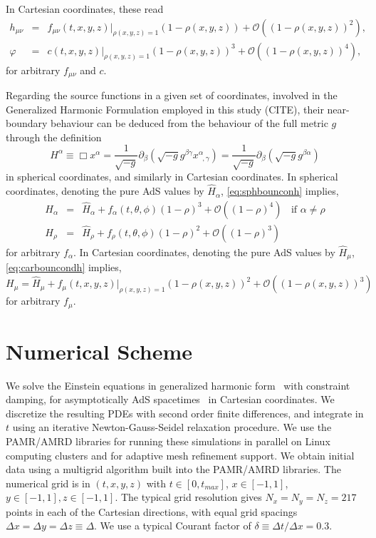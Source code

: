 \documentclass[a4paper,11pt]{article}
\begin{document}
In Cartesian coordinates, these read
\begin{eqnarray}
\label{eq:carbouncondh}
h_{\mu\nu}&=&f_{\mu\nu}(t,x,y,z)|_{\rho(x,y,z)=1}(1-\rho(x,y,z))+\mathcal{O}((1-\rho(x,y,z))^{2}), \\
\label{eq:carbouncondphi}
\varphi&=&c(t,x,y,z)|_{\rho(x,y,z)=1}(1-\rho(x,y,z))^3+\mathcal{O}((1-\rho(x,y,z))^{4}), 
\end{eqnarray}
for arbitrary $f_{\mu\nu}$ and $c$.

Regarding the source functions in a given set of coordinates, involved in the Generalized Harmonic Formulation employed in this study (CITE), their near-boundary behaviour can be deduced from the behaviour of the full metric $g$ through the definition 
\begin{equation}\label{eq:defsoufunsph}
H^\alpha \equiv \Box x^\alpha = \frac{1}{\sqrt{-g}}\partial_\beta (\sqrt{-g}g^{\beta\gamma}x^\alpha_{\;\;,\gamma})=\frac{1}{\sqrt{-g}}\partial_\beta (\sqrt{-g}g^{\beta\alpha})
\end{equation}
in spherical coordinates, and similarly in Cartesian coordinates. 
In spherical coordinates, denoting the pure AdS values by $\hat{H}_\alpha$, \eqref{eq:sphbounconh} implies,
\begin{eqnarray}\label{eq:sphbouncondsoufunc}
H_\alpha&=&\hat{H}_\alpha+f_\alpha(t,\theta,\phi)(1-\rho)^3+\mathcal{O}((1-\rho)^4) \;\; \textrm{ if $\alpha\neq\rho$} \\ \nonumber
H_\rho&=&\hat{H}_\rho+f_\rho(t,\theta,\phi)(1-\rho)^2+\mathcal{O}((1-\rho)^3)
\end{eqnarray}
for arbitrary $f_\alpha$.
In Cartesian coordinates,  denoting the pure AdS values by $\hat{H}_\mu$, \eqref{eq:carbouncondh} implies,
\begin{equation}\label{eq:carbouncondsoufun}
H_\mu=\hat{H}_\mu+f_\mu(t,x,y,z)|_{\rho(x,y,z)=1}(1-\rho(x,y,z))^2+\mathcal{O}((1-\rho(x,y,z))^3)
\end{equation}
for arbitrary $f_\mu$.
\fi

\iffalse
\section{Numerical Scheme}\label{sec:numerical_scheme}

We solve the Einstein equations in generalized harmonic form~\cite{Pretorius:2004jg} with constraint damping, for asymptotically AdS spacetimes~\cite{Bantilan:2012vu} in Cartesian coordinates.
We discretize the resulting PDEs with second order finite differences, and integrate in $t$ using an iterative Newton-Gauss-Seidel relaxation procedure. 
We use the PAMR/AMRD libraries \cite{PAMR} for running these simulations in parallel on Linux computing clusters and for adaptive mesh refinement support.
We obtain initial data using a multigrid algorithm built into the PAMR/AMRD libraries.
The numerical grid is in $(t,x,y,z)$ with $t \in [0,t_{max}]$, $x \in [-1,1]$, $y \in [-1,1], z \in [-1,1]$.
The typical grid resolution gives $N_x=N_y=N_z=217$ points in each of the Cartesian directions, with equal grid spacings $\Delta x = \Delta y = \Delta z\equiv \Delta$.
We use a typical Courant factor of $\delta \equiv \Delta t / \Delta x = 0.3$.
\end{document}
